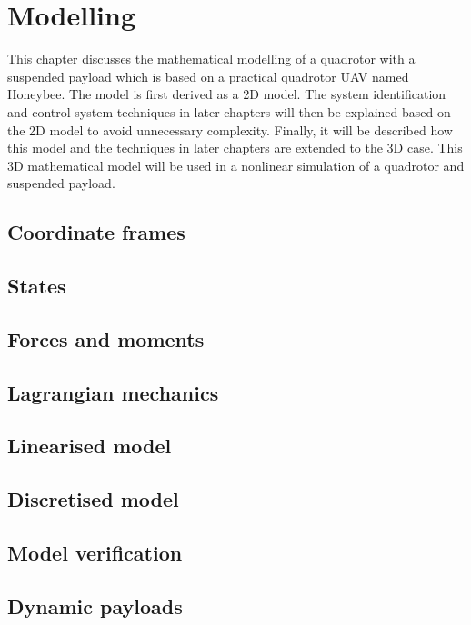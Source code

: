 \graphicspath{{modelling/fig/}}

\chapter{Modelling}
\label{chap:modelling}

This chapter discusses the mathematical modelling of a quadrotor with a suspended
payload which is based on a practical quadrotor UAV named Honeybee.
The model is first derived as a 2D model.
The system identification and control system techniques in later chapters will then be explained based on the 2D model to avoid unnecessary complexity.
Finally, it will be described how this model and the techniques in later chapters are extended to the 3D case.
This 3D mathematical model will be used in a nonlinear simulation of a quadrotor and suspended payload.

\section{Coordinate frames}
\section{States}
\section{Forces and moments}
\section{Lagrangian mechanics}
\section{Linearised model}
    \label{sec:linear_model}

\section{Discretised model}
\section{Model verification}
\section{Dynamic payloads}

